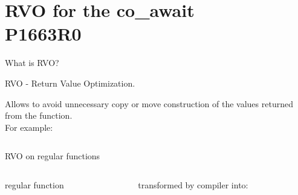 \documentclass[10pt]{beamer}
\begin{document}
\section{RVO for the co\_await \\ P1663R0}

\begin{frame}{What is RVO?}
\centerline{\alert{RVO} - Return Value Optimization.}

\vfill

Allows to avoid unnecessary copy or move construction of the values returned from the function. \\
\pause
For example:

\vfill

\inputminted{c++}{code-examples/RVO_examples/example.cpp}

\end{frame}

\begin{frame}[fragile]{RVO on regular functions}

\begin{columns}[T]
\begin{column}{0.4\linewidth}
\centerline{regular function}
\vfill
\inputminted{c++}{code-examples/RVO_examples/regular_function_rvo.cpp}
\vfill
\end{column}
\begin{column}{0.55\linewidth}
\centerline{transformed by compiler into:}
\vfill
\inputminted{c++}{code-examples/RVO_examples/transformed_function_rvo.cpp}
\vfill
\end{column}
\end{columns}

\end{frame}
\end{document}
